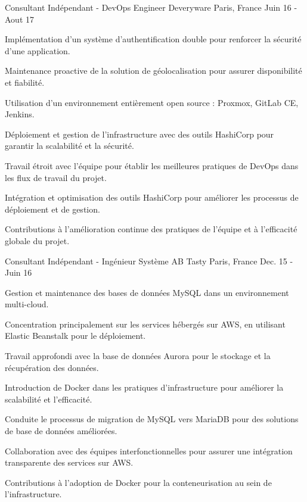 \begin{cventries}
  \cventry
    {Consultant Indépendant - DevOps Engineer} %
    {Deveryware} %
    {Paris, France} %
    {Juin 16 - Aout 17} %
    {
      \begin{cvitems} %
        \item {Implémentation d'un système d'authentification double pour renforcer la sécurité d'une application.}
        \item {Maintenance proactive de la solution de géolocalisation pour assurer disponibilité et fiabilité.}
        \item {Utilisation d'un environnement entièrement open source : Proxmox, GitLab CE, Jenkins.}
        \item {Déploiement et gestion de l'infrastructure avec des outils HashiCorp pour garantir la scalabilité et la sécurité.}
        \item {Travail étroit avec l'équipe pour établir les meilleures pratiques de DevOps dans les flux de travail du projet.}
        \item {Intégration et optimisation des outils HashiCorp pour améliorer les processus de déploiement et de gestion.}
        \item {Contributions à l'amélioration continue des pratiques de l'équipe et à l'efficacité globale du projet.}
      \end{cvitems}
    }

  \cventry
    {Consultant Indépendant - Ingénieur Système} %
    {AB Tasty} %
    {Paris, France} %
    {Dec. 15 - Juin 16} %
    {
      \begin{cvitems} %
        \item {Gestion et maintenance des bases de données MySQL dans un environnement multi-cloud.}
        \item {Concentration principalement sur les services hébergés sur AWS, en utilisant Elastic Beanstalk pour le déploiement.}
        \item {Travail approfondi avec la base de données Aurora pour le stockage et la récupération des données.}
        \item {Introduction de Docker dans les pratiques d'infrastructure pour améliorer la scalabilité et l'efficacité.}
        \item {Conduite le processus de migration de MySQL vers MariaDB pour des solutions de base de données améliorées.}
        \item {Collaboration avec des équipes interfonctionnelles pour assurer une intégration transparente des services sur AWS.}
        \item {Contributions à l'adoption de Docker pour la conteneurisation au sein de l'infrastructure.}
      \end{cvitems}
    }


\end{cventries}
